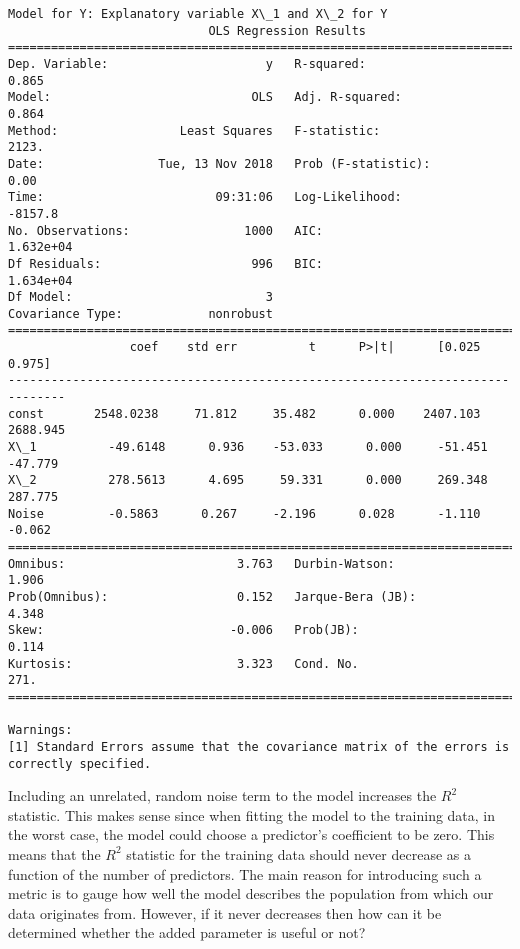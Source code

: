 \documentclass[11pt]{article}
\begin{document}
    \begin{Verbatim}[commandchars=\\\{\}]
Model for Y: Explanatory variable X\_1 and X\_2 for Y
                            OLS Regression Results                            
==============================================================================
Dep. Variable:                      y   R-squared:                       0.865
Model:                            OLS   Adj. R-squared:                  0.864
Method:                 Least Squares   F-statistic:                     2123.
Date:                Tue, 13 Nov 2018   Prob (F-statistic):               0.00
Time:                        09:31:06   Log-Likelihood:                -8157.8
No. Observations:                1000   AIC:                         1.632e+04
Df Residuals:                     996   BIC:                         1.634e+04
Df Model:                           3                                         
Covariance Type:            nonrobust                                         
==============================================================================
                 coef    std err          t      P>|t|      [0.025      0.975]
------------------------------------------------------------------------------
const       2548.0238     71.812     35.482      0.000    2407.103    2688.945
X\_1          -49.6148      0.936    -53.033      0.000     -51.451     -47.779
X\_2          278.5613      4.695     59.331      0.000     269.348     287.775
Noise         -0.5863      0.267     -2.196      0.028      -1.110      -0.062
==============================================================================
Omnibus:                        3.763   Durbin-Watson:                   1.906
Prob(Omnibus):                  0.152   Jarque-Bera (JB):                4.348
Skew:                          -0.006   Prob(JB):                        0.114
Kurtosis:                       3.323   Cond. No.                         271.
==============================================================================

Warnings:
[1] Standard Errors assume that the covariance matrix of the errors is correctly specified.

    \end{Verbatim}

    Including an unrelated, random noise term to the model increases the
\(R^2\) statistic. This makes sense since when fitting the model to the
training data, in the worst case, the model could choose a predictor's
coefficient to be zero. This means that the \(R^2\) statistic for the
training data should never decrease as a function of the number of
predictors. The main reason for introducing such a metric is to gauge
how well the model describes the population from which our data
originates from. However, if it never decreases then how can it be
determined whether the added parameter is useful or not?
\end{document}
